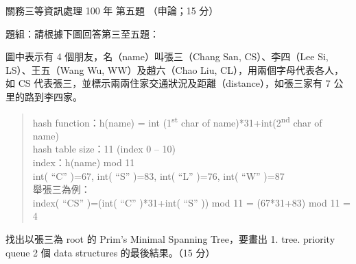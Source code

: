 \begin{pastexam}[label={px:gw3-100-ds-05}]{關務三等資訊處理 100 年 第五題}
（申論；15 分）

題組：請根據下圖回答第三至五題：

圖中表示有 4 個朋友，名（name）叫張三（Chang San, CS）、李四（Lee Si, LS）、王五（Wang Wu, WW）及趙六（Chao Liu, CL），用兩個字母代表各人，如 CS 代表張三，並標示兩兩住家交通狀況及距離（distance），如張三家有 7 公里的路到李四家。
\begin{center}
\end{center}
\begin{quote}
hash function：h(name) = int (1\textsuperscript{st} char of name)*31+int(2\textsuperscript{nd} char of name)\\
hash table size：11 \quad (index 0 – 10)\\
index：h(name) mod 11\\
int( “C” )=67, int( “S” )=83, int( “L” )=76, int( “W” )=87\\
舉張三為例：\\
index( “CS” )=(int( “C” )*31+int( “S” )) mod 11 = (67*31+83) mod 11 = 4
\end{quote}

找出以張三為 root 的 Prim's Minimal Spanning Tree，要畫出 1. tree. priority queue 2 個 data structures 的最後結果。（15 分）
\end{pastexam}

